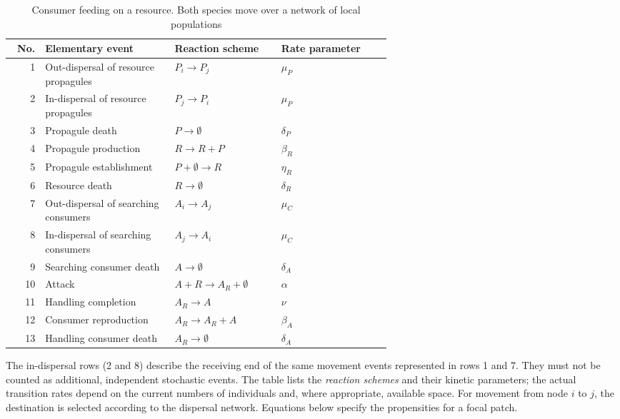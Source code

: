 \begin{table}[h]
\centering
\small
\renewcommand{\arraystretch}{1.19}
\begin{tabular}{@{}r p{0.34\linewidth} p{0.28\linewidth} l@{}}
\hline
No. & Elementary event & Reaction scheme & Rate parameter \\
\hline
1 & Out-dispersal of resource propagules & $ P_i \to P_j $ & $ \mu_P $ {equation}\label{outPopagule} \\
2 & In-dispersal of resource propagules & $ P_j \to P_i $ & $ \mu_P $ {equation}\label{inPopagule} \\
3 & Propagule death & $ P \to \emptyset $ & $ \delta_P $ {equation}\label{PopaguleDeath} \\
4 & Propagule production & $ R \to R+P $ & $ \beta_R $ {equation}\label{Birth_P} \\
5 & Propagule establishment & $ P+\emptyset \to R $ & $ \eta_R $ {equation}\label{Establishment_P} \\
6 & Resource death & $ R \to \emptyset $ & $ \delta_R $ {equation}\label{Death_R} \\
\hline
7 & Out-dispersal of searching consumers & $ A_i \to A_j $ & $ \mu_C $ {equation}\label{outSearching} \\
8 & In-dispersal of searching consumers & $ A_j \to A_i $ & $ \mu_C $ {equation}\label{inSearching} \\
9 & Searching consumer death & $ A \to \emptyset $ & $ \delta_A $ {equation}\label{Death_A} \\
10 & Attack & $ A+R \to A_R+\emptyset $ & $ \alpha $ {equation}\label{Attack} \\
11 & Handling completion & $ A_R \to A $ & $ \nu $ {equation}\label{Handling} \\
12 & Consumer reproduction & $ A_R \to A_R+A $ & $ \beta_A $ {equation}\label{Growth_A} \\
13 & Handling consumer death & $ A_R \to \emptyset $ & $ \delta_A $ {equation}\label{Death_AR} \\
\hline
\end{tabular}
    \caption{Consumer feeding on a resource. Both species move over a network of local populations}
    \label{tab:consumer-resource-events}
\end{table}

\noindent The in-dispersal rows (2 and 8) describe the receiving end of the same movement events represented in rows 1 and 7. They must not be counted as additional, independent stochastic events. The table lists the \emph{reaction schemes} and their kinetic parameters; the actual transition rates depend on the current numbers of individuals and, where appropriate, available space. For movement from node $i$ to $j$, the destination is selected according to the dispersal network. Equations below specify the propensities for a focal patch.


